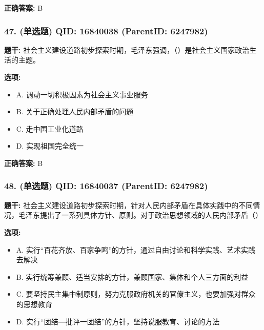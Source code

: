 \documentclass[12pt,UTF8]{ctexart}
\begin{document}
\textbf{正确答案:}
B

\vspace{0.3em}\hrulefill\vspace{0.7em}

\subsubsection*{47. (单选题) \small QID: 16840038 (ParentID: 6247982)}

\textbf{题干:}
社会主义建设道路初步探索时期，毛泽东强调，（）是社会主义国家政治生活的主题。



\textbf{选项:}
\begin{itemize}[leftmargin=*]

  \item A. 调动一切积极因素为社会主义事业服务

  \item B. 关于正确处理人民内部矛盾的问题

  \item C. 走中国工业化道路

  \item D. 实现祖国完全统一

\end{itemize}

\textbf{正确答案:}
B

\vspace{0.3em}\hrulefill\vspace{0.7em}

\subsubsection*{48. (单选题) \small QID: 16840037 (ParentID: 6247982)}

\textbf{题干:}
社会主义建设道路初步探索时期，针对人民内部矛盾在具体实践中的不同情况，毛泽东提出了一系列具体方针、原则。对于政治思想领域的人民内部矛盾（）



\textbf{选项:}
\begin{itemize}[leftmargin=*]

  \item A. 实行“百花齐放、百家争鸣”的方针，通过自由讨论和科学实践、艺术实践去解决

  \item B. 实行统筹兼顾、适当安排的方针，兼顾国家、集体和个人三方面的利益

  \item C. 要坚持民主集中制原则，努力克服政府机关的官僚主义，也要加强对群众的思想教育

  \item D. 实行“团结—批评一团结”的方针，坚持说服教育、讨论的方法

\end{itemize}
\end{document}

